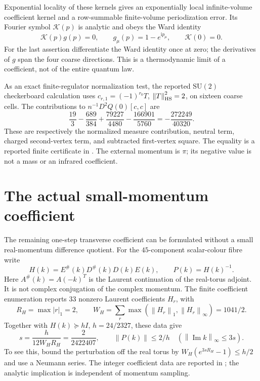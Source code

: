 \documentclass[11pt,oneside,openany]{book}
\theoremstyle{definition}
\theoremstyle{remark}
\newcommand{\ii}{\mathrm i}
\newcommand{\SU}{\mathrm{SU}}
\newcommand{\norm}[1]{\left\lVert#1\right\rVert}
\newcommand{\src}[2]{\cite[#2]{#1}}
\begin{document}
Exponential locality of these kernels gives an exponentially local
infinite-volume coefficient kernel and a row-summable finite-volume
periodization error. Its Fourier symbol $\mathcal K(p)$ is analytic
and obeys the Ward identity
\[
 \mathcal K(p)g(p)=0,\qquad g_\mu(p)=1-e^{\ii p_\mu},\qquad
 \mathcal K(0)=0.
\]
For the last assertion differentiate the Ward identity once at zero;
the derivatives of $g$ span the four coarse directions. This is a
thermodynamic limit of a coefficient, not of the entire quantum law.

As an exact finite-regulator normalization test, the reported
$\SU(2)$ checkerboard calculation uses
$c_{r,1}=(-1)^{r_0}T$, $\norm T_{\rm HS}^2=2$, on sixteen coarse cells.
The contributions to $n^{-1}D^2\widehat Q(0)[c,c]$ are
\[
 \frac{19}{3}-\frac{689}{384}
          +\frac{79227}{4480}-\frac{166901}{5760}
                      =-\frac{272249}{40320}.
\]
These are respectively the normalized measure contribution, neutral
term, charged second-vertex term, and subtracted first-vertex square.
The equality is a reported finite certificate in \src{F11}{V94--V99}.
The external momentum is $\pi$; its negative value is not a mass or an
infrared coefficient.

\section{The actual small-momentum coefficient}
\label{sec:actual-theta}
The remaining one-step transverse coefficient can be formulated without
a small real-momentum difference quotient. For the $45$-component
scalar-colour fibre write
\[
 H(k)=E^\#(k)D^\#(k)D(k)E(k),\qquad P(k)=H(k)^{-1}.
\]
Here $A^\#(k)=A(-k)^T$ is the Laurent continuation of the real-torus
adjoint. It is not complex conjugation of the complex momentum.
The finite coefficient enumeration reports $33$ nonzero Laurent
coefficients $H_r$, with
\[
 R_H=\max|r|_1=2,\qquad
 W_H=\sum_r\max(\norm{H_r}_1,\norm{H_r}_\infty)=1041/2.
\]
Together with $H(k)\succeq hI$, $h=24/2327$, these data give
\begin{equation}\label{eq:actual-holomorphic-strip}
 s=\frac{h}{12W_HR_H}=\frac2{2422407},\qquad
 \norm{P(k)}\le2/h\quad(\norm{\operatorname{Im}k}_\infty\le3s).
\end{equation}
To see this, bound the perturbation off the real torus by
$W_H(e^{3sR_H}-1)\le h/2$ and use a Neumann series.
The integer coefficient data are reported in \src{F12}{V5}; the
analytic implication is independent of momentum sampling.
\end{document}

